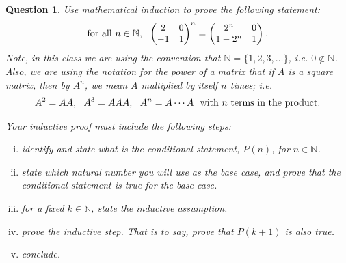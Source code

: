 \documentclass[12pt]{article}
\newtheorem{question}[thm]{Question}
\def\Natural{\mathbb{N}}
\newcommand{\MatrixTwoTwo}[4]{\begin{pmatrix} #1 &#2\\ #3 &#4 \end{pmatrix}}
\begin{document}
\vspace{.5cm}





\begin{question}
	\normalfont
	
	Use mathematical induction to prove the following statement:
	\begin{align*}
		\textnormal{for all}\ n\in\Natural,\ \ 
		\MatrixTwoTwo{2}{0}{-1}{1}^n
		= \MatrixTwoTwo{2^n}{0}{1-2^n}{1}.
	\end{align*}
	Note, in this class we are using the convention that $\Natural = \{1,2,3,\dots\}$, i.e. $0\not\in\Natural$.
	Also, we are using the notation for the power of a matrix that if $A$ is a square matrix, then by $A^n$, we mean $A$ multiplied by itself $n$ times; i.e.
	\begin{align*}
		A^2 = AA,\ \ A^3 = AAA,\ \ A^n = A\cdots A\ \ \textnormal{with $n$ terms in the product}.
	\end{align*}
	
	Your inductive proof must include the following steps:
	\begin{enumerate}[(i)]
		\item identify and state what is the conditional statement, $P(n)$, for $n\in \Natural$.
		\item state which natural number you will use as the base case, and prove that the conditional statement is true for the base case.
		\item for a fixed $k\in\Natural$, state the inductive assumption.
		\item prove the inductive step.  That is to say, prove that $P(k+1)$ is also true.
		\item conclude.
	\end{enumerate}
\end{question}









\end{document}
